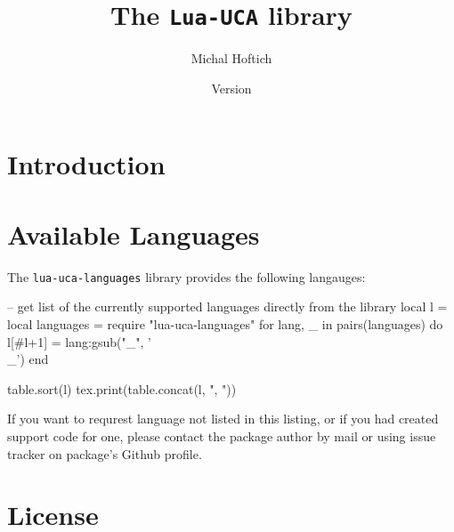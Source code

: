 \documentclass{ltxdoc}
\title{The \texttt{Lua-UCA} library}
\author{Michal Hoftich\authormail{michal.h21@gmail.com}}
\date{Version \version\\\gitdate}
\begin{document}
\maketitle
\tableofcontents
\section{Introduction}

\section{Available Languages}

\begin{raggedright}
The \texttt{lua-uca-languages} library provides the following langauges:
\bgroup\ttfamily
\begin{luacode*}
-- get list of the currently supported languages directly from the library
local l = {}
local languages = require "lua-uca-languages"
for lang, _ in pairs(languages) do
l[#l+1] = lang:gsub("_", '\\_')
end

table.sort(l)
tex.print(table.concat(l, ", "))
\end{luacode*}
\egroup
\end{raggedright}

If you want to requrest  language not listed in this listing, or if you had
created support code for one, please contact the package author by mail or using
issue tracker on package's Github profile.


\section{License}
\end{document}
